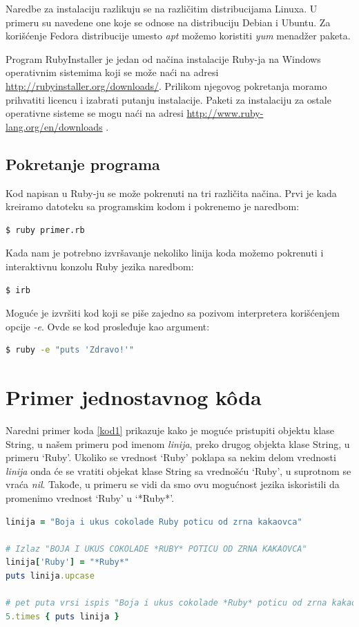\documentclass[a4paper]{article}
\begin{document}
Naredbe za instalaciju razlikuju se na različitim distribucijama Linuxa. U primeru su navedene one koje se odnose na distribuciju Debian i Ubuntu. Za korišćenje Fedora distribucije umesto \emph{apt} možemo koristiti \emph{yum} menadžer paketa.

Program RubyInstaller je jedan od načina instalacije Ruby-ja na Windows operativnim sistemima koji se može naći na adresi \url{http://rubyinstaller.org/downloads/}. Prilikom njegovog pokretanja moramo prihvatiti licencu i izabrati putanju instalacije. Paketi za instalaciju za ostale operativne sisteme se mogu naći na adresi \url{http://www.ruby-lang.org/en/downloads} \cite{rubyLang}.
\subsection{Pokretanje programa}
Kod napisan u Ruby-ju se može pokrenuti na tri različita načina. Prvi je kada kreiramo datoteku sa programskim kodom i pokrenemo je naredbom:
\begin{lstlisting}[language=bash]
  $ ruby primer.rb
\end{lstlisting}\vspace*{-15pt}
Kada nam je potrebno izvršavanje nekoliko linija koda možemo pokrenuti i interaktivnu konzolu Ruby jezika naredbom:
\begin{lstlisting}[language=bash]
  $ irb
\end{lstlisting}\vspace*{-15pt}
Moguće je izvršiti kod koji se piše zajedno sa pozivom interpretera korišćenjem opcije \emph{-e}. Ovde se kod prosleđuje kao argument:
\begin{lstlisting}[language=bash]
  $ ruby -e "puts 'Zdravo!'"
\end{lstlisting}\vspace*{-15pt}

\section{Primer jednostavnog k\^{o}da}
Naredni  primer koda \ref{kod1} prikazuje kako je moguće pristupiti objektu klase String, u našem primeru pod imenom \emph{linija}, preko drugog objekta klase String, u primeru ‘Ruby’. Ukoliko se vrednost ‘Ruby’ poklapa sa nekim delom vrednosti \emph{linija} onda će se vratiti objekat klase String sa vrednošću ‘Ruby’, u suprotnom se vraća \emph{nil}. Takođe, u primeru se vidi da smo ovu mogućnost jezika iskoristili da promenimo vrednost ‘Ruby’ u ‘*Ruby*’.
\begin{lstlisting}[language=Ruby, caption={Prvi primer koda}, frame=single, label=kod1]
linija = "Boja i ukus cokolade Ruby poticu od zrna kakaovca"

# Izlaz "BOJA I UKUS COKOLADE *RUBY* POTICU OD ZRNA KAKAOVCA"
linija['Ruby'] = "*Ruby*"
puts linija.upcase

# pet puta vrsi ispis "Boja i ukus cokolade *Ruby* poticu od zrna kakaovca"
5.times { puts linija }
\end{lstlisting}
\end{document}
